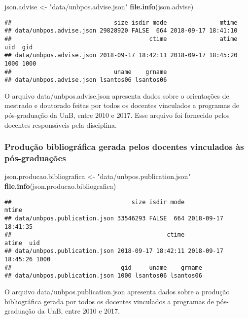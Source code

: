 \documentclass[]{article}
\newenvironment{Shaded}{\begin{snugshade}}{\end{snugshade}}
\newcommand{\KeywordTok}[1]{\textcolor[rgb]{0.13,0.29,0.53}{\textbf{#1}}}
\newcommand{\StringTok}[1]{\textcolor[rgb]{0.31,0.60,0.02}{#1}}
\newcommand{\NormalTok}[1]{#1}
\begin{document}
\begin{Shaded}
\begin{Highlighting}[]
\NormalTok{json.advise <-}\StringTok{ "data/unbpos.advise.json"}
\KeywordTok{file.info}\NormalTok{(json.advise)}
\end{Highlighting}
\end{Shaded}

\begin{verbatim}
##                             size isdir mode               mtime
## data/unbpos.advise.json 29828920 FALSE  664 2018-09-17 18:41:10
##                                       ctime               atime  uid  gid
## data/unbpos.advise.json 2018-09-17 18:42:11 2018-09-17 18:45:20 1000 1000
##                             uname    grname
## data/unbpos.advise.json lsantos06 lsantos06
\end{verbatim}

O arquivo data/unbpos.advise.json apresenta dados sobre o orientações de
mestrado e doutorado feitas por todos os docentes vinculados a programas
de pós-graduação da UnB, entre 2010 e 2017. Esse arquivo foi fornecido
pelos docentes responsáveis pela disciplina.

\subsubsection{Produção bibliográfica gerada pelos docentes vinculados
às
pós-graduações}\label{producao-bibliografica-gerada-pelos-docentes-vinculados-as-pos-graduacoes}

\begin{Shaded}
\begin{Highlighting}[]
\NormalTok{json.producao.bibliografica <-}\StringTok{ "data/unbpos.publication.json"}
\KeywordTok{file.info}\NormalTok{(json.producao.bibliografica) }
\end{Highlighting}
\end{Shaded}

\begin{verbatim}
##                                  size isdir mode               mtime
## data/unbpos.publication.json 33546293 FALSE  664 2018-09-17 18:41:35
##                                            ctime               atime  uid
## data/unbpos.publication.json 2018-09-17 18:42:11 2018-09-17 18:45:26 1000
##                               gid     uname    grname
## data/unbpos.publication.json 1000 lsantos06 lsantos06
\end{verbatim}

O arquivo data/unbpos.publication.json apresenta dados sobre a produção
bibliográfica gerada por todos os docentes vinculados a programas de
pós-graduação da UnB, entre 2010 e 2017.
\end{document}
